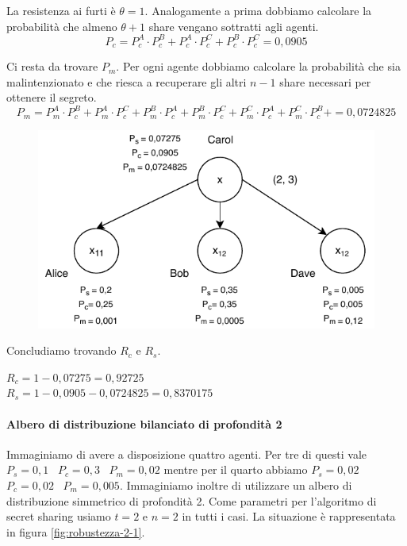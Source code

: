 La resistenza ai furti è $ \theta = 1 $. Analogamente a prima dobbiamo calcolare la probabilità che
almeno $ \theta + 1 $ share vengano sottratti agli agenti.
$$ P_c = P_c^A \cdot P_c^B + P_c^A \cdot P_c^C + P_c^B \cdot P_c^C = 0,0905 $$

Ci resta da trovare $ P_m $. Per ogni agente dobbiamo calcolare la probabilità che sia malintenzionato e che riesca
a recuperare gli altri $ n - 1 $ share necessari per ottenere il segreto.
$$ P_m =
	P_m^A \cdot P_c^B + P_m^A \cdot P_c^C +
	P_m^B \cdot P_c^A + P_m^B \cdot P_c^C +
	P_m^C \cdot P_c^A + P_m^C \cdot P_c^B +
	= 0,0724825 $$

\begin{figure}[H]
	\centering
	\includegraphics[width=0.6\linewidth]{images/chap_analisi_robustezza/robustezza-1.pdf}
\end{figure}

Concludiamo trovando $ R_c $ e $ R_s $.
\begin{tightcenter}
	$ R_c = 1 - 0,07275 = 0,92725 $\\
	$ R_s = 1 - 0,0905 - 0,0724825 = 0,8370175 $
\end{tightcenter}


\paragraph{Albero di distribuzione bilanciato di profondità 2}
Immaginiamo di avere a disposizione quattro agenti. Per tre di questi
vale
$ P_s = 0,1 $ \,
$ P_c = 0,3 $ \,
$ P_m = 0,02 $
mentre per il quarto abbiamo
$ P_s = 0,02 $ \,
$ P_c = 0,02 $ \,
$ P_m = 0,005 $.
Immaginiamo inoltre di utilizzare un albero di distribuzione simmetrico di profondità 2.
Come parametri per l'algoritmo di secret sharing usiamo $ t = 2 $ e $ n = 2 $ in tutti i casi.
La situazione è rappresentata in figura \ref{fig:robustezza-2-1}.

